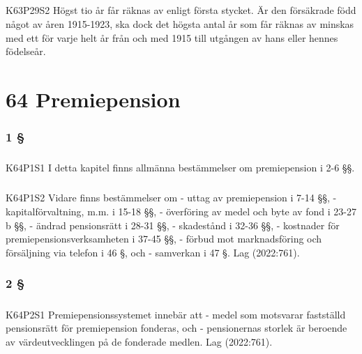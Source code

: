 \documentclass[a4paper,notitlepage,openany,10pt]{book}
\begin{document}
\paragraph*{}
{\tiny K63P29S2}
Högst tio år får räknas av enligt första stycket. Är den försäkrade född något av åren 1915-1923, ska dock det högsta antal år som får räknas av minskas med ett för varje helt år från och med 1915 till utgången av hans eller hennes födelseår.
\chapter*{64 Premiepension}
\subsection*{1 §}
\paragraph*{}
{\tiny K64P1S1}
I detta kapitel finns allmänna bestämmelser om premiepension i 2-6 §§.
\paragraph*{}
{\tiny K64P1S2}
Vidare finns bestämmelser om
\newline - uttag av premiepension i 7-14 §§,
\newline - kapitalförvaltning, m.m. i 15-18 §§,
\newline - överföring av medel och byte av fond i 23-27 b §§,
\newline - ändrad pensionsrätt i 28-31 §§,
\newline - skadestånd i 32-36 §§,
\newline - kostnader för premiepensionsverksamheten i 37-45 §§,
\newline - förbud mot marknadsföring och försäljning via telefon i 46 §, och
\newline - samverkan i 47 §.
Lag (2022:761).
\subsection*{2 §}
\paragraph*{}
{\tiny K64P2S1}
Premiepensionssystemet innebär att
\newline - medel som motsvarar fastställd pensionsrätt för premiepension fonderas, och
\newline - pensionernas storlek är beroende av värdeutvecklingen på de fonderade medlen.
Lag (2022:761).
\end{document}
